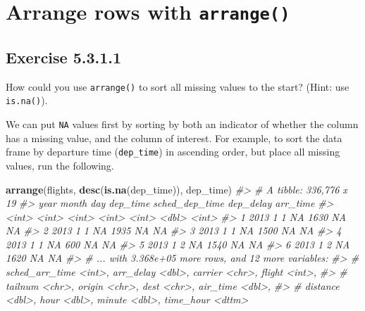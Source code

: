 \documentclass[]{book}
\newenvironment{Shaded}{\begin{snugshade}}{\end{snugshade}}
\newcommand{\CommentTok}[1]{\textcolor[rgb]{0.56,0.35,0.01}{\textit{#1}}}
\newcommand{\KeywordTok}[1]{\textcolor[rgb]{0.13,0.29,0.53}{\textbf{#1}}}
\newcommand{\NormalTok}[1]{#1}
\theoremstyle{plain}
\theoremstyle{remark}
\begin{document}
\hypertarget{arrange-rows-with-arrange}{%
\section{\texorpdfstring{Arrange rows with
\texttt{arrange()}}{Arrange rows with arrange()}}\label{arrange-rows-with-arrange}}

\hypertarget{exercise-5.3.1.1}{%
\subsection*{\texorpdfstring{Exercise
{5.3.1.1}}{Exercise 5.3.1.1}}\label{exercise-5.3.1.1}}

How could you use \texttt{arrange()} to sort all missing values to the
start? (Hint: use \texttt{is.na()}).

We can put \texttt{NA} values first by sorting by both an indicator of
whether the column has a missing value, and the column of interest. For
example, to sort the data frame by departure time (\texttt{dep\_time})
in ascending order, but place all missing values, run the following.

\begin{Shaded}
\begin{Highlighting}[]
\KeywordTok{arrange}\NormalTok{(flights, }\KeywordTok{desc}\NormalTok{(}\KeywordTok{is.na}\NormalTok{(dep_time)), dep_time)}
\CommentTok{#> # A tibble: 336,776 x 19}
\CommentTok{#>    year month   day dep_time sched_dep_time dep_delay arr_time}
\CommentTok{#>   <int> <int> <int>    <int>          <int>     <dbl>    <int>}
\CommentTok{#> 1  2013     1     1       NA           1630        NA       NA}
\CommentTok{#> 2  2013     1     1       NA           1935        NA       NA}
\CommentTok{#> 3  2013     1     1       NA           1500        NA       NA}
\CommentTok{#> 4  2013     1     1       NA            600        NA       NA}
\CommentTok{#> 5  2013     1     2       NA           1540        NA       NA}
\CommentTok{#> 6  2013     1     2       NA           1620        NA       NA}
\CommentTok{#> # ... with 3.368e+05 more rows, and 12 more variables:}
\CommentTok{#> #   sched_arr_time <int>, arr_delay <dbl>, carrier <chr>, flight <int>,}
\CommentTok{#> #   tailnum <chr>, origin <chr>, dest <chr>, air_time <dbl>,}
\CommentTok{#> #   distance <dbl>, hour <dbl>, minute <dbl>, time_hour <dttm>}
\end{Highlighting}
\end{Shaded}
\end{document}
